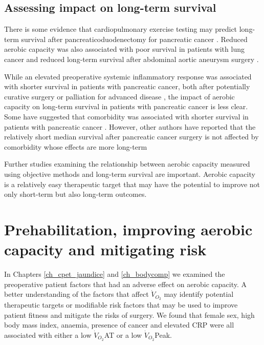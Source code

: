 \subsection{Assessing impact on long-term survival}

There is some evidence that cardiopulmonary exercise testing may predict long-term survival after pancreaticoduodenectomy for pancreatic cancer \parencite{junejo_cardiopulmonary_2014}.
Reduced aerobic capacity was also associated with poor survival in patients with lung cancer \parencite{jones_peak_2010} and reduced long-term survival after abdominal aortic aneurysm surgery \parencite{tang_cardiopulmonary_2012, grant_cardiopulmonary_2015}.

While an elevated preoperative systemic inflammatory response was associated with shorter survival in patients with pancreatic cancer, both after potentially curative surgery \parencite{jamieson_systemic_2005, torre_glasgow_2012} or palliation for advanced disease \parencite{glen_evaluation_2006}, the impact of aerobic capacity on long-term survival in patients with pancreatic cancer is less clear.
Some have suggested that comorbidity was associated with shorter survival in patients with pancreatic cancer \parencite{dias-santos_charlson_2015}.
However, other authors have reported that the relatively short median survival after pancreatic cancer surgery is not affected by comorbidity whose effects are more long-term \parencite{kos_evaluation_2014}

Further studies examining the relationship between aerobic capacity measured using objective methods and long-term survival are important. 
Aerobic capacity is a relatively easy therapeutic target that may have the potential to improve not only short-term but also long-term outcomes. 


\section{Prehabilitation, improving aerobic capacity and mitigating risk}
\label{disc_prehabilitation}
In Chapters \ref{ch_cpet_jaundice} and \ref{ch_bodycomp} we examined the preoperative patient factors that had an adverse effect on aerobic capacity.
A better understanding of the factors that affect $\dot{V}_{O_2}$ may identify potential therapeutic targets or modifiable risk factors that may be used to improve patient fitness and mitigate the risks of surgery.
We found that female sex, high body mass index, anaemia, presence of cancer and elevated CRP were all associated with either a low $\dot{V}_{O_2}$AT or a low $\dot{V}_{O_2}$Peak.

